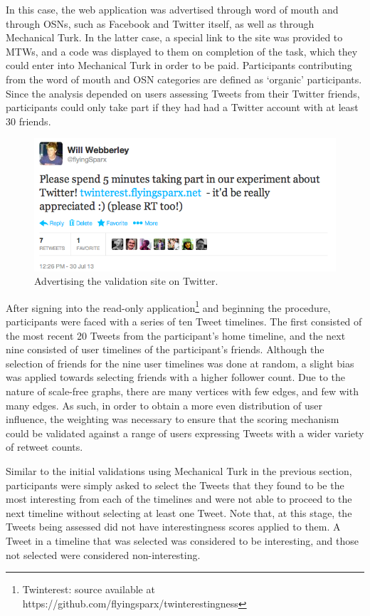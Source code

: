In this case, the web application was advertised through word of mouth and through OSNs, such as Facebook and Twitter itself, as well as through Mechanical Turk. In the latter case, a special link to the site was provided to MTWs, and a code was displayed to them on completion of the task, which they could enter into Mechanical Turk in order to be paid. Participants contributing from the word of mouth and OSN categories are defined as `organic' participants. Since the analysis depended on users assessing Tweets from their Twitter friends, participants could only take part if they had had a Twitter account with at least 30 friends.

\begin{figure}[h]
\centering
\includegraphics[scale=0.5]{5.Chapter3/Media/organic_advertising.png} 
\caption{Advertising the validation site on Twitter.}
\label{fig:organic_advertising}
\end{figure}

After signing into the read-only application\footnote{Twinterest: source available at https://github.com/flyingsparx/twinterestingness} and beginning the procedure, participants were faced with a series of ten Tweet timelines. The first consisted of the most recent 20 Tweets from the participant's home timeline, and the next nine consisted of user timelines of the participant's friends. Although the selection of friends for the nine user timelines was done at random, a slight bias was applied towards selecting friends with a higher follower count. Due to the nature of scale-free graphs, there are many vertices with few edges, and few with many edges. As such, in order to obtain a more even distribution of user influence, the weighting was necessary to ensure that the scoring mechanism could be validated against a range of users expressing Tweets with a wider variety of retweet counts.

Similar to the initial validations using Mechanical Turk in the previous section, participants were simply asked to select the Tweets that they found to be the most interesting from each of the timelines and were not able to proceed to the next timeline without selecting at least one Tweet. Note that, at this stage, the Tweets being assessed did not have interestingness scores applied to them. A Tweet in a timeline that was selected was considered to be interesting, and those not selected were considered non-interesting.



